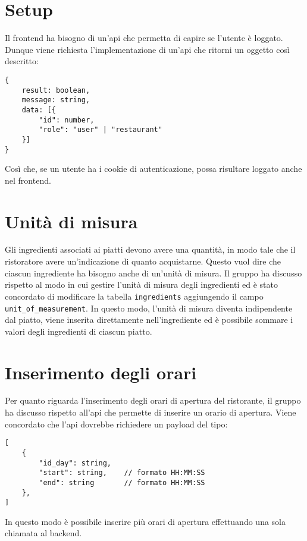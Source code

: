 \section{Setup}

Il frontend ha bisogno di un'api che permetta di capire se l'utente è loggato.
Dunque viene richiesta l'implementazione di un'api che ritorni un oggetto così
descritto:

\begin{lstlisting}
{
	result: boolean,
	message: string,
	data: [{
		"id": number,
		"role": "user" | "restaurant"
	}]
}
\end{lstlisting}

Così che, se un utente ha i cookie di autenticazione, possa risultare loggato
anche nel frontend.

\section{Unità di misura}

Gli ingredienti associati ai piatti devono avere una quantità, in modo tale che
il ristoratore avere un'indicazione di quanto acquistarne. Questo vuol dire che
ciascun ingrediente ha bisogno anche di un'unità di misura. Il gruppo ha
discusso rispetto al modo in cui gestire l'unità di misura degli ingredienti ed
è stato concordato di modificare la tabella \texttt{ingredients} aggiungendo il
campo \texttt{unit\_of\_measurement}. In questo modo, l'unità di misura diventa
indipendente dal piatto, viene inserita direttamente nell'ingrediente ed è
possibile sommare i valori degli ingredienti di ciascun piatto.

\section{Inserimento degli orari}

Per quanto riguarda l'inserimento degli orari di apertura del ristorante, il
gruppo ha discusso rispetto all'api che permette di inserire un orario di
apertura. Viene concordato che l'api dovrebbe richiedere un payload del tipo:

\begin{lstlisting}
[
	{
		"id_day": string,
		"start": string,    // formato HH:MM:SS
		"end": string       // formato HH:MM:SS
	},
]
\end{lstlisting}

In questo modo è possibile inserire più orari di apertura effettuando una sola
chiamata al backend.
